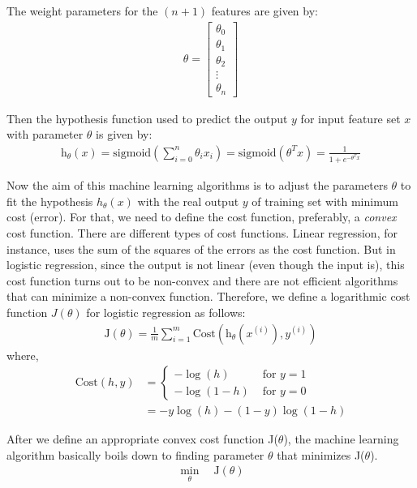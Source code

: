 The weight parameters for the $(n+1)$ features are given by:
\begin{align}
  \theta =
  \begin{bmatrix}
    \theta_0 \\ \theta_1 \\ \theta_2 \\ \vdots \\ \theta_n
  \end{bmatrix}
  \nonumber
\end{align}

Then the hypothesis function used to predict the output $y$ for
input feature set $x$ with parameter $\theta$ is given by:
\begin{align}
  \text{h}_{\theta}(x) =
  \text{sigmoid}\left( \sum_{i = 0}^{n} \theta_{i} x_{i}\right) =
  \text{sigmoid}\left( \theta^{T}x \right) =
  \frac{1}{1 + e^{-\theta^{T}x}}
  \label{eqn:hypothesis}
\end{align}

Now the aim of this machine learning algorithms is to adjust the parameters
$\theta$ to fit the hypothesis $h_{\theta}(x)$ with the real output $y$ of
training set with minimum cost (error). For that, we need to define the cost
function, preferably, a {\em convex} cost function. There are different types
of cost functions. Linear regression, for instance, uses the sum of the squares
of the errors as the cost function. But in logistic regression, since the output
is not linear (even though the input is), this cost function turns out to be
non-convex and there are not efficient algorithms that can minimize a non-convex
function. Therefore, we define a logarithmic cost function $J(\theta)$ for logistic regression
as follows:
\begin{align}
  \text{J}(\theta) = \frac{1}{m} \sum_{i=1}^{m}
  \text{Cost} \left( \text{h}_\theta \left(x^{(i)} \right), y^{(i)} \right)
  \label{eqn:j}
\end{align}
where,
\begin{align}
  \text{Cost} (h, y) &=
  \begin{cases}
    -\log (h) &\text{ for } y = 1 \\
    -\log (1-h) &\text{ for } y = 0
  \end{cases}
  \nonumber\\
  &= -y\log(h) - (1-y)\log(1-h)
  \label{eqn:cost}
\end{align}

After we define an appropriate convex cost function J($\theta$), the machine
learning algorithm basically boils down to finding parameter $\theta$
that minimizes J($\theta$).
\begin{align}
  \min_{\theta} \quad \text{J}(\theta)
\end{align}

